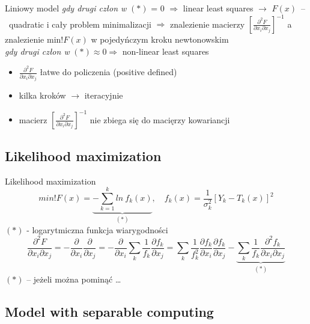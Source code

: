   \begin{frame}{Liniowy model}
    \emph{gdy drugi człon w} $(*)$ = 0 $\Rightarrow$
    linear least squares $\to$ $F(x)$~--~quadratic
    i cały problem minimalizacji $\Rightarrow$ znalezienie
    macierzy $\left[ \frac{\partial^2 F}{\partial x_{i} \partial x_{j}} \right]^{-1}$
    a znalezienie min!$F(x)$ w pojedyńczym kroku newtonowskim\\
    \emph{gdy drugi człon w} $(*) \approx 0 \Rightarrow$
    non-linear least squares\\
    \begin{itemize}
      \item $\frac{\partial^2 F}{\partial x_{i} \partial x_{j}}$
      łatwe do policzenia (positive defined) %
      \item kilka kroków $\to$ iteracyjnie
      \item macierz $\left[ \frac{\partial^2 F}{\partial x_{i} \partial x_{j}} \right]^{-1}$
      nie zbiega się do macięrzy kowariancji
    \end{itemize}
  \end{frame}

\subsection{Likelihood maximization}
  \begin{frame}{Likelihood maximization}
    \begin{equation}
      min!F(x) = \underbrace{- \sum_{k=1}^{k} ln\ f_{k}(x)}_{(*)}{,} \quad
      f_{k}(x) = \frac{1}{\sigma^{2}_{k}} \left[ Y_{k} - T_{k}(x) \right]^2
      \nonumber
    \end{equation}
    $(*)$ - logarytmiczna funkcja wiarygodności
    \begin{equation}
      \frac{\partial^2 F}{\partial x_{i} \partial x_{j}} =
      - \frac{\partial}{\partial x_{i}}\frac{\partial}{\partial x_{j}} =
      - \frac{\partial}{\partial x_{i}}
      \sum_{k} \frac{1}{f_{k}} \frac{\partial f_{k}}{\partial x_{j}} =
      \sum_{k} \frac{1}{f^{2}_{k}} \frac{\partial f_{k}}{\partial x_{i}} \frac{\partial f_{k}}{\partial x_{j}} -
      \underbrace{\sum_{k} \frac{1}{f_{k}} \frac{\partial^{2} f_{k}}{\partial x_{i} \partial x_{j}}}_{(*)}
      \nonumber
    \end{equation}
    $(*)$ -- jeżeli można pominąć \dots
  \end{frame}

\subsection{Model with separable computing}

